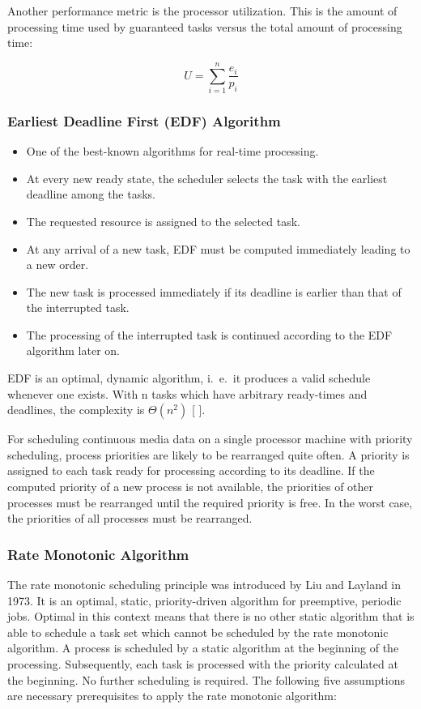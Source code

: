 Another performance metric is the processor utilization. This is the amount of processing time used by guaranteed tasks versus the total amount of processing time:

\[
U={\sum_{i=1}^{n}} \frac{e_i}{p_i}
\]
	
\subsubsection[Earliest Deadline First Algorithm]{Earliest Deadline First (EDF) Algorithm}
\begin{multicols}{2}
	\begin{itemize}
		\item One of the best-known algorithms for real-time processing. 
		\item At every new ready state, the scheduler selects the task with the earliest deadline among the tasks. 
		\item The requested resource is assigned to the selected task. 
		\item At any arrival of a new task, EDF must be computed immediately leading to a new order.
		\item The new task is processed immediately if its deadline is earlier than that of the interrupted task. 
		\item The processing of the interrupted task is continued according to the EDF algorithm later on.
	\end{itemize}
\end{multicols}


EDF is an optimal, dynamic algorithm, i.\ e.\, it produces a valid schedule whenever one exists. With n tasks which have arbitrary ready-times and deadlines, the complexity is $ \Theta ( n^2)$ [ ].

For scheduling continuous media data on a single processor machine with priority scheduling, process priorities are likely to be rearranged quite often. A priority is assigned to each task ready for processing according to its deadline. If the
computed priority of a new process is not available, the priorities of other processes must be rearranged until the required priority is free. In the worst case, the priorities of all processes must be rearranged.

\subsubsection{Rate Monotonic Algorithm}
The rate monotonic scheduling principle was introduced by Liu and Layland in 1973. It is an optimal, static, priority-driven algorithm for preemptive, periodic jobs. Optimal in this context means that there is no other static algorithm that is able to schedule a task set which cannot be scheduled by the rate monotonic algorithm. A process is scheduled by a static algorithm at the beginning of the processing. Subsequently, each task is processed with the priority calculated at the beginning. No further scheduling is required. The following five assumptions are necessary prerequisites to apply the
rate monotonic algorithm:

